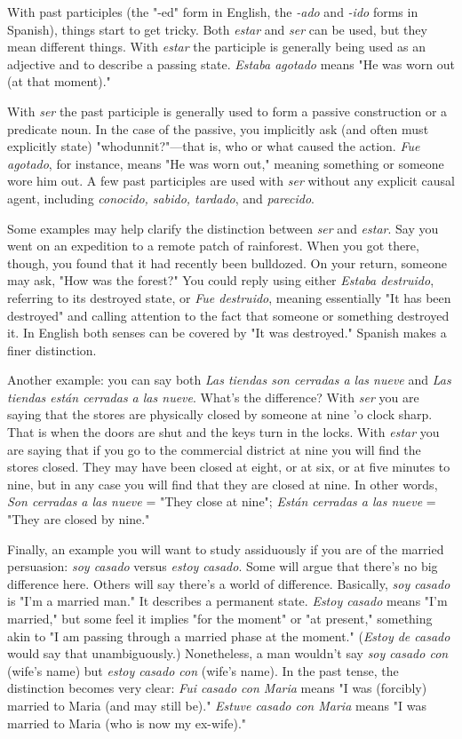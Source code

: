 \documentclass[14pt,a4paper,oneside]{memoir}
\begin{document}
With past participles (the "-ed" form in English, the \emph{-ado} and
\emph{-ido} forms in Spanish), things start to get tricky. Both \emph{estar} and \emph{ser}
can be used, but they mean different things. With \emph{estar} the participle
is generally being used as an adjective and to describe a passing state.
\emph{Estaba agotado} means "He was worn out (at that moment)."

With \emph{ser} the past participle is generally used to form a passive
construction or a predicate noun. In the case of the passive, you implicitly ask (and often must explicitly state) "whodunnit?"---that is,
who or what caused the action. \emph{Fue agotado}, for instance, means "He
was worn out," meaning something or someone wore him out. A few
past participles are used with \emph{ser} without any explicit causal agent, including \emph{conocido, sabido, tardado}, and \emph{parecido}.

Some examples may help clarify the distinction between \emph{ser}
and \emph{estar}. Say you went on an expedition to a remote patch of rainforest. When you got there, though, you found that it had recently been
bulldozed. On your return, someone may ask, "How was the forest?"
You could reply using either \emph{Estaba destruido}, referring to its destroyed state, or \emph{Fue destruido}, meaning essentially "It has been destroyed" and calling attention to the fact that someone or something
destroyed it. In English both senses can be covered by "It was destroyed." Spanish makes a finer distinction.

Another example: you can say both \emph{Las tiendas son cerradas a
las nueve} and \emph{Las tiendas están cerradas a las nueve}. What's the difference? With \emph{ser} you are saying that the stores are physically closed
by someone at nine 'o clock sharp. That is when the doors are shut and
the keys turn in the locks. With \emph{estar} you are saying that if you go to
the commercial district at nine you will find the stores closed. They
may have been closed at eight, or at six, or at five minutes to nine, but
in any case you will find that they are closed at nine. In other words,
\emph{Son cerradas a las nueve} = "They close at nine"; \emph{Están cerradas a las
nueve} = "They are closed by nine."

Finally, an example you will want to study assiduously if you
are of the married persuasion: \emph{soy casado} versus \emph{estoy casado}. Some
will argue that there's no big difference here. Others will say there's a
world of difference. Basically, \emph{soy casado} is "I'm a married man." It
describes a permanent state. \emph{Estoy casado} means "I'm married," but
some feel it implies "for the moment" or "at present," something akin
to "I am passing through a married phase at the moment." (\emph{Estoy de
casado} would say that unambiguously.) Nonetheless, a man wouldn't
say \emph{soy casado con} (wife's name) but \emph{estoy casado con} (wife's name).
In the past tense, the distinction becomes very clear: \emph{Fui casado con
Maria} means "I was (forcibly) married to Maria (and may still be)." \emph{Estuve casado con Maria} means "I was married to Maria (who is now my ex-wife)."
\end{document}

